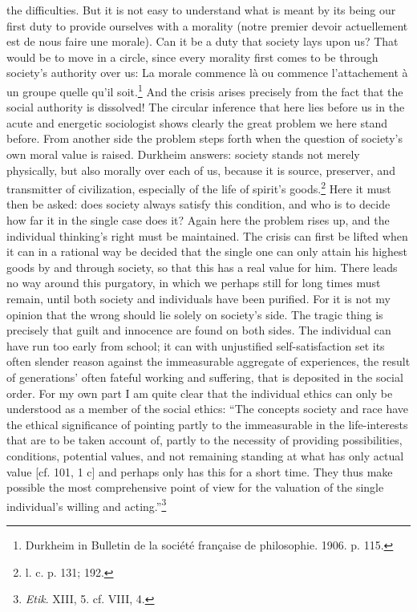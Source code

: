 \documentclass[12pt,a4paper]{book}
\newcommand{\opage}[1]{\marginnote{\footnotesize\textit{[#1]}}}
\begin{document}
the difficulties. But it is not easy to understand what is meant by its being our first duty to provide
ourselves with a morality (notre premier devoir actuellement est de nous faire une morale). Can it be a duty
that society lays upon us? That would be to move in a circle, since every morality first comes to be through
society's authority over us: La morale commence là ou commence l'attachement à un groupe quelle qu'il
soit.\footnote{Durkheim in Bulletin de la société française de philosophie. 1906. p. 115.} And the crisis
arises precisely from the fact that the social authority is dissolved! The circular inference that here lies
before us in the acute and energetic sociologist shows clearly the great problem we here stand before. From
another side the problem steps forth when the question of society's own moral value is raised. Durkheim
answers: society stands not merely physically, but also morally over each of us, because it is source,
preserver, and transmitter of civilization, especially of the life of spirit's goods.\footnote{l. c. p. 131;
192.} Here it must then be asked: does society always satisfy this condition, and who is to decide how far it
in the single case does it? Again here the problem rises up, and the individual thinking's right must be
maintained. The crisis can first be lifted when it can in a rational way be decided that the single one can
only attain his highest goods by and through society, so that this has a real value for him. There leads no
way around this purgatory, in which we perhaps still for long times must remain, until both society and
individuals have been purified. For it is not my opinion that the wrong should lie solely on society's side.
The tragic thing is precisely that guilt and innocence are found on both sides. The individual can have run
too early from school; it can with unjustified self-satisfaction set its often slender reason against the
immeasurable aggregate of experiences, the result of generations' often fateful working and suffering, that
is deposited in the social order. \opage{356}For my own part I am quite clear that the individual ethics can only be
understood as a member of the social ethics: ``The concepts society and race have the ethical significance of
pointing partly to the immeasurable in the life-interests that are to be taken account of, partly to the
necessity of providing possibilities, conditions, potential values, and not remaining standing at what has
only actual value [cf. 101, 1 c] and perhaps only has this for a short time. They thus make possible the most
comprehensive point of view for the valuation of the single individual's willing and acting.''\footnote{\emph{Etik}.
XIII, 5. cf. VIII, 4.}
\end{document}
